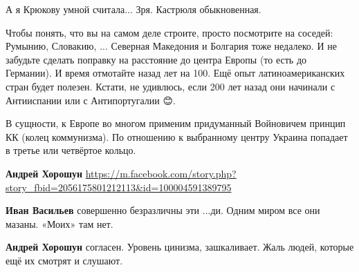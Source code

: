 \begin{itemize}
А я Крюкову умной считала... Зря. Кастрюля обыкновенная.

 
Чтобы понять, что вы на самом деле строите, просто посмотрите на соседей:
Румынию, Словакию, ... Северная Македония и Болгария тоже недалеко. И не
забудьте сделать поправку на расстояние до центра Европы (то есть до Германии).
И время отмотайте назад лет на 100. Ещё опыт латиноамериканских стран будет
полезен. Кстати, не удивлюсь, если 200 лет назад они начинали с Антииспании или
с Антипортугалии 😊.

\begin{itemize}
 
В сущности, к Европе во многом применим придуманный Войновичем принцип КК (колец коммунизма). По отношению к выбранному центру Украина попадает в третье или четвёртое кольцо.
\end{itemize}

 
\textbf{Андрей Хорошун} \url{https://m.facebook.com/story.php?story_fbid=2056175801212113&id=100004591389795}


\begin{itemize}
 
\textbf{Иван Васильев} совершенно безразличны эти ...ди. Одним миром все они мазаны. «Моих» там нет.

 
\textbf{Андрей Хорошун} согласен. Уровень цинизма, зашкаливает. Жаль людей, которые ещё их смотрят и слушают.


\end{itemize}
\end{itemize}
